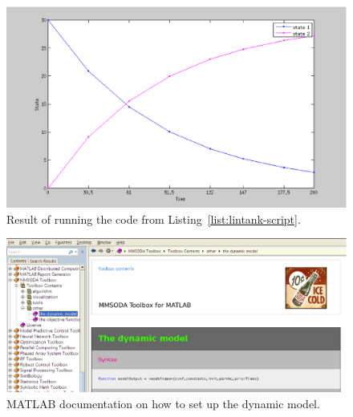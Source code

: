 

\begin{figure}[htb]
  \centering
    \includegraphics[width=\textwidth]{./../eps/result-of-lintank-script.eps}
  \caption{Result of running the code from Listing~\ref{list:lintank-script}.}
  \label{fig:result-of-lintank-script}
\end{figure}




\begin{figure}[htb]
  \centering
    \includegraphics[width=\textwidth]{./../eps/doc-the-dynamic-model.eps}
  \caption{MATLAB documentation on how to set up the dynamic model.}
  \label{fig:doc-the-dynamic-model}
\end{figure}

